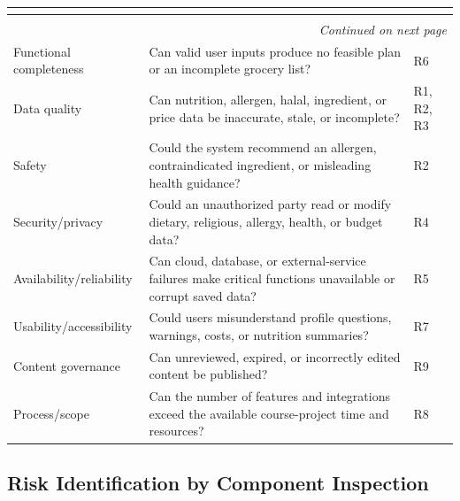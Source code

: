 \documentclass[11pt,a4paper]{article}
\renewcommand{\arraystretch}{1.15}
\begin{document}
\begin{center}
\small
\setlength{\tabcolsep}{2.5pt}
\renewcommand{\arraystretch}{1.18}
\begin{longtable}{|p{3.3cm}|p{10.0cm}|p{2.2cm}|}
\hline
\rowcolor{headerblue} \textbf{\color{white}{Checklist category}} & \textbf{\color{white}{Checklist question}} & \textbf{\color{white}{Risks found}} \\ \hline
\endfirsthead
\hline
\rowcolor{headerblue} \textbf{\color{white}{Checklist category}} & \textbf{\color{white}{Checklist question}} & \textbf{\color{white}{Risks found}} \\ \hline
\endhead
\hline
\multicolumn{3}{r}{\small\itshape Continued on next page}\\
\endfoot
\hline
\endlastfoot
Functional completeness & Can valid user inputs produce no feasible plan or an incomplete grocery list? & R6 \\ \hline
Data quality & Can nutrition, allergen, halal, ingredient, or price data be inaccurate, stale, or incomplete? & R1, R2, R3 \\ \hline
Safety & Could the system recommend an allergen, contraindicated ingredient, or misleading health guidance? & R2 \\ \hline
Security/privacy & Could an unauthorized party read or modify dietary, religious, allergy, health, or budget data? & R4 \\ \hline
Availability/reliability & Can cloud, database, or external-service failures make critical functions unavailable or corrupt saved data? & R5 \\ \hline
Usability/accessibility & Could users misunderstand profile questions, warnings, costs, or nutrition summaries? & R7 \\ \hline
Content governance & Can unreviewed, expired, or incorrectly edited content be published? & R9 \\ \hline
Process/scope & Can the number of features and integrations exceed the available course-project time and resources? & R8 \\ \hline
\end{longtable}
\end{center}

\subsection{Risk Identification by Component Inspection}
\end{document}

